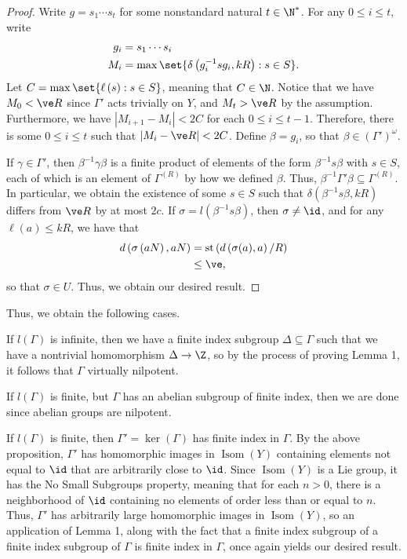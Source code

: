 \documentclass[10pt]{mypackage}
\begin{document}
\begin{proof}
  Write $g = s_1\cdots s_t$ for some nonstandard natural $t\in \N^{\ast}$. For any $0\leq i \leq t$, write
  \begin{align*}
    g_i &= s_1\cdots s_i\\
    M_i &= \max\set{\delta\left( g_i^{-1}sg_i,kR \right) : s\in S}.
  \end{align*}
  Let $C = \max\set{\ell\left( s \right) : s\in S}$, meaning that $C\in \N$. Notice that we have $M_0 < \ve R$ since $\Gamma'$ acts trivially on $Y$, and $M_t > \ve R$ by the assumption. Furthermore, we have $\left\vert M_{i+1}-M_i \right\vert < 2C$ for each $0\leq i \leq t-1$. Therefore, there is some $0\leq i\leq t$ such that $\left\vert M_i - \ve R \right\vert < 2C$. Define $\beta = g_i$, so that $\beta\in \left( \Gamma' \right)^{\omega}$.

  If $\gamma\in \Gamma'$, then $\beta^{-1}\gamma\beta$ is a finite product of elements of the form $\beta^{-1}s\beta$ with $s\in S$, each of which is an element of $\Gamma^{(R)}$ by how we defined $\beta$. Thus, $\beta^{-1}\Gamma'\beta\subseteq \Gamma^{(R)}$. In particular, we obtain the existence of some $s\in S$ such that $\delta\left( \beta^{-1}s\beta,kR \right)$ differs from $\ve R$ by at most $2c$. If $\sigma = l\left( \beta^{-1}s\beta \right)$, then $\sigma\neq \id$, and for any $\ell\left( a \right)\leq kR$, we have that
  \begin{align*}
    d\left( \sigma\left( aN \right),aN \right) &= \operatorname{st}\left( d\left( \sigma(a),a \right)/R \right)\\
                                               &\leq \ve,
  \end{align*}
  so that $\sigma\in U$. Thus, we obtain our desired result.
\end{proof}
Thus, we obtain the following cases.

If $l\left( \Gamma \right)$ is infinite, then we have a finite index subgroup $\Delta\subseteq \Gamma$ such that we have a nontrivial homomorphism $\Delta\to \Z$, so by the process of proving Lemma 1, it follows that $\Gamma$ virtually nilpotent.

If $l\left( \Gamma \right)$ is finite, but $\Gamma$ has an abelian subgroup of finite index, then we are done since abelian groups are nilpotent.

If $l\left( \Gamma \right)$ is finite, then $\Gamma' = \ker\left( \Gamma \right)$ has finite index in $\Gamma$. By the above proposition, $\Gamma'$ has homomorphic images in $\operatorname{Isom}\left( Y \right)$ containing elements not equal to $\id$ that are arbitrarily close to $\id$. Since $\operatorname{Isom}\left( Y \right)$ is a Lie group, it has the No Small Subgroups property, meaning that for each $n > 0$, there is a neighborhood of $\id$ containing no elements of order less than or equal to $n$. Thus, $\Gamma'$ has arbitrarily large homomorphic images in $\operatorname{Isom}\left( Y \right)$, so an application of Lemma 1, along with the fact that a finite index subgroup of a finite index subgroup of $\Gamma$ is finite index in $\Gamma$, once again yields our desired result.
\nocite{gromov_polynomial_growth_paper,van_den_dries_wilkie_paper,topics_in_groups_and_geometry,lectures_on_hyperreals}
\printbibliography
\end{document}

